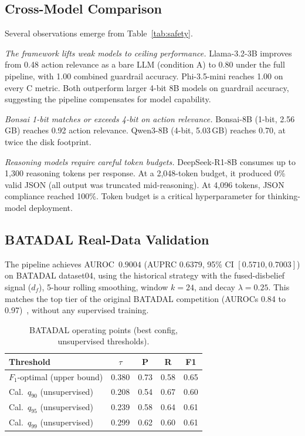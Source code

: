 \documentclass[conference]{IEEEtran}
\begin{document}
\subsection{Cross-Model Comparison}

Several observations emerge from Table~\ref{tab:safety}.

\textit{The framework lifts weak models to ceiling performance.} Llama-3.2-3B improves from 0.48 action relevance as a bare LLM (condition A) to 0.80 under the full pipeline, with 1.00 combined guardrail accuracy. Phi-3.5-mini reaches 1.00 on every C metric. Both outperform larger 4-bit 8B models on guardrail accuracy, suggesting the pipeline compensates for model capability.

\textit{Bonsai 1-bit matches or exceeds 4-bit on action relevance.} Bonsai-8B (1-bit, 2.56\,GB) reaches 0.92 action relevance. Qwen3-8B (4-bit, 5.03\,GB) reaches 0.70, at twice the disk footprint.

\textit{Reasoning models require careful token budgets.} DeepSeek-R1-8B consumes up to 1{,}300 reasoning tokens per response. At a 2{,}048-token budget, it produced 0\% valid JSON (all output was truncated mid-reasoning). At 4{,}096 tokens, JSON compliance reached 100\%. Token budget is a critical hyperparameter for thinking-model deployment.

\subsection{BATADAL Real-Data Validation}

The pipeline achieves AUROC~$0.9004$ (AUPRC $0.6379$, 95\% CI $[0.5710, 0.7003]$) on BATADAL dataset04, using the historical strategy with the fused-disbelief signal ($d_f$), 5-hour rolling smoothing, window $k=24$, and decay $\lambda=0.25$. This matches the top tier of the original BATADAL competition (AUROCs 0.84 to 0.97)~\cite{taormina2018battle}, without any supervised training.

\begin{table}[t]
\centering
\caption{BATADAL operating points (best config, unsupervised thresholds).}
\label{tab:batadal-ops}
\footnotesize
\begin{tabular}{@{}lcccc@{}}
\toprule
\textbf{Threshold} & $\tau$ & \textbf{P} & \textbf{R} & \textbf{F1} \\
\midrule
$F_1$-optimal (upper bound) & 0.380 & 0.73 & 0.58 & 0.65 \\
Cal.\ $q_{90}$ (unsupervised) & 0.208 & 0.54 & 0.67 & 0.60 \\
Cal.\ $q_{95}$ (unsupervised) & 0.239 & 0.58 & 0.64 & 0.61 \\
Cal.\ $q_{99}$ (unsupervised) & 0.299 & 0.62 & 0.60 & 0.61 \\
\bottomrule
\end{tabular}
\end{table}
\end{document}
